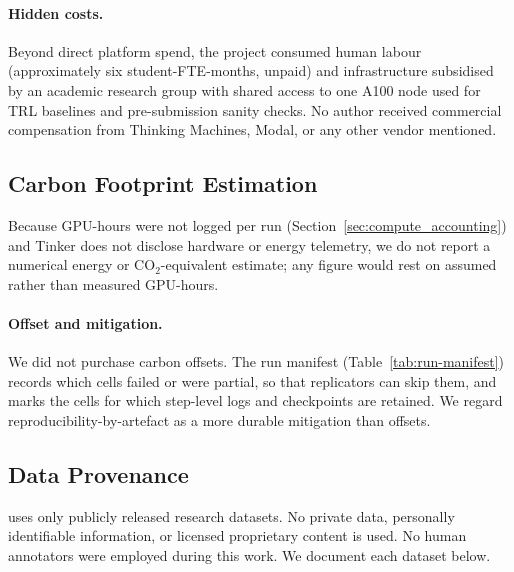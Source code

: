 \paragraph{Hidden costs.} Beyond direct platform spend, the project
consumed human labour (approximately six student-FTE-months, unpaid) and
infrastructure subsidised by an academic research group with
shared access to one A100 node used for TRL baselines and
pre-submission sanity checks. No author received commercial compensation
from Thinking Machines, Modal, or any other vendor mentioned.

\subsection{Carbon Footprint Estimation}
\label{sec:carbon}

Because GPU-hours were not logged per run (Section~\ref{sec:compute_accounting})
and Tinker does not disclose hardware or energy telemetry, we do not report a
numerical energy or CO$_2$-equivalent estimate; any figure would rest on
assumed rather than measured GPU-hours.

\paragraph{Offset and mitigation.}
We did not purchase carbon offsets. The run manifest
(Table~\ref{tab:run-manifest}) records which cells failed or were partial,
so that replicators can skip them, and marks the cells for which step-level
logs and checkpoints are retained. We regard reproducibility-by-artefact as a
more durable mitigation than offsets.

\subsection{Data Provenance}
\label{sec:provenance}

\ours{} uses only publicly released research datasets. No private data,
personally identifiable information, or licensed proprietary content is
used. No human annotators were employed during this work. We document
each dataset below.

